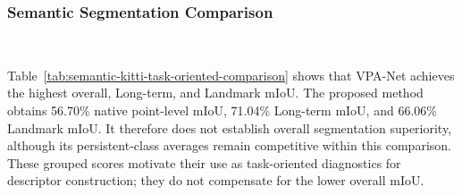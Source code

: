 \subsubsection{Semantic Segmentation Comparison}~\label{subsubsec:semantic-segmentation-comparison}

Table~\ref{tab:semantic-kitti-task-oriented-comparison} shows that VPA-Net achieves the highest overall, Long-term, and Landmark mIoU. The proposed method obtains 56.70\% native point-level mIoU, 71.04\% Long-term mIoU, and 66.06\% Landmark mIoU. It therefore does not establish overall segmentation superiority, although its persistent-class averages remain competitive within this comparison. These grouped scores motivate their use as task-oriented diagnostics for descriptor construction; they do not compensate for the lower overall mIoU.

